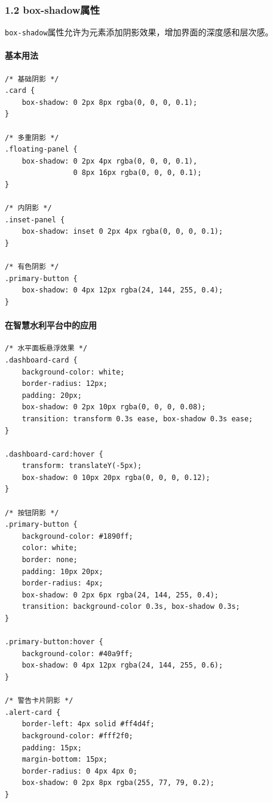 \subsubsection{1.2 box-shadow属性}\label{box-shadowux5c5eux6027}

\passthrough{\lstinline!box-shadow!}属性允许为元素添加阴影效果，增加界面的深度感和层次感。

\paragraph{基本用法}\label{ux57faux672cux7528ux6cd5-1}

\begin{lstlisting}
/* 基础阴影 */
.card {
    box-shadow: 0 2px 8px rgba(0, 0, 0, 0.1);
}

/* 多重阴影 */
.floating-panel {
    box-shadow: 0 2px 4px rgba(0, 0, 0, 0.1),
                0 8px 16px rgba(0, 0, 0, 0.1);
}

/* 内阴影 */
.inset-panel {
    box-shadow: inset 0 2px 4px rgba(0, 0, 0, 0.1);
}

/* 有色阴影 */
.primary-button {
    box-shadow: 0 4px 12px rgba(24, 144, 255, 0.4);
}
\end{lstlisting}

\paragraph{在智慧水利平台中的应用}\label{ux5728ux667aux6167ux6c34ux5229ux5e73ux53f0ux4e2dux7684ux5e94ux7528-1}

\begin{lstlisting}
/* 水平面板悬浮效果 */
.dashboard-card {
    background-color: white;
    border-radius: 12px;
    padding: 20px;
    box-shadow: 0 2px 10px rgba(0, 0, 0, 0.08);
    transition: transform 0.3s ease, box-shadow 0.3s ease;
}

.dashboard-card:hover {
    transform: translateY(-5px);
    box-shadow: 0 10px 20px rgba(0, 0, 0, 0.12);
}

/* 按钮阴影 */
.primary-button {
    background-color: #1890ff;
    color: white;
    border: none;
    padding: 10px 20px;
    border-radius: 4px;
    box-shadow: 0 2px 6px rgba(24, 144, 255, 0.4);
    transition: background-color 0.3s, box-shadow 0.3s;
}

.primary-button:hover {
    background-color: #40a9ff;
    box-shadow: 0 4px 12px rgba(24, 144, 255, 0.6);
}

/* 警告卡片阴影 */
.alert-card {
    border-left: 4px solid #ff4d4f;
    background-color: #fff2f0;
    padding: 15px;
    margin-bottom: 15px;
    border-radius: 0 4px 4px 0;
    box-shadow: 0 2px 8px rgba(255, 77, 79, 0.2);
}
\end{lstlisting}

